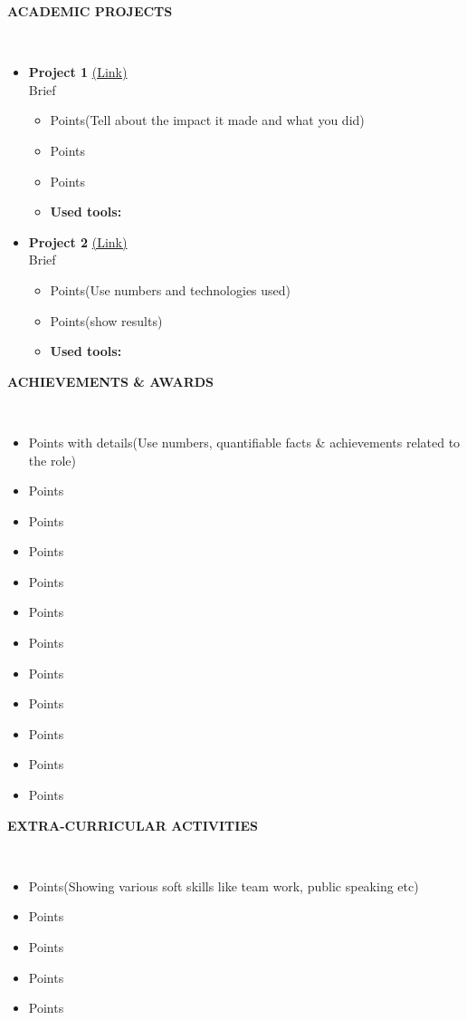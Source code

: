 \documentclass[a4paper,10pt]{article}
\newcommand{\resheading}[1]{{\small \colorbox{mygrey}{\begin{minipage}{0.99\textwidth}{\textbf{#1
\vphantom{p\^{E}}}}\end{minipage}}}}
\begin{document}
\noindent
\resheading{\textbf{ACADEMIC PROJECTS} }\\[-0.3cm]
\begin{itemize}[noitemsep,nolistsep]
\item \textbf{Project 1} \href{}{(Link)} \\
{Brief}
\begin{itemize}[noitemsep,nolistsep]
    \item Points(Tell about the impact it made and what you did)
    \item Points
    \item Points
    \item \textbf{Used tools:} 
\end{itemize}

\item \textbf{Project 2} \href{}{(Link)} \\
{Brief}
\begin{itemize}[noitemsep,nolistsep]
    \item Points(Use numbers and technologies used)
    \item Points(show results)
    \item \textbf{Used tools:} 
\end{itemize}

\end{itemize}

\noindent
\resheading{\textbf{ACHIEVEMENTS \& AWARDS}}\\[-0.4cm]
\begin{itemize}
\setlength\itemsep{-0.4em}

\item Points with details(Use numbers, quantifiable facts & achievements related to the role)
\item Points
\item Points
\item Points
\item Points
\item Points
\item Points
\item Points
\item Points
\item Points
\item Points
\item Points

\end{itemize}

\noindent
\resheading{\textbf{EXTRA-CURRICULAR ACTIVITIES}}\\[-0.4cm]
\begin{itemize}
\setlength\itemsep{-0.4em}
\item Points(Showing various soft skills like team work, public speaking etc)
\item Points
\item Points
\item Points
\item Points

\end{itemize}
\end{document}
